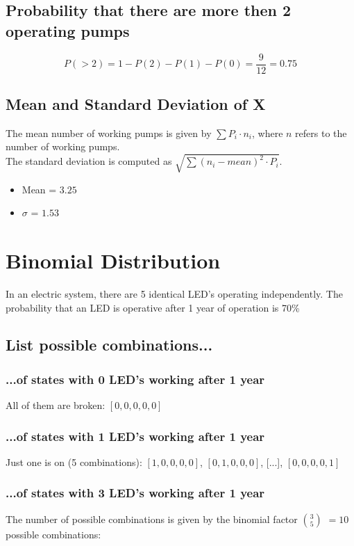 \documentclass{article}
\begin{document}
\subsection{Probability that there are more then 2 operating pumps}
\begin{equation}
    P(>2) = 1 - P(2) - P(1) -P(0) = \frac{9}{12} = 0.75
\end{equation}


\subsection{Mean and Standard Deviation of X}
The mean number of working pumps is given by $\sum{P_i \cdot n_i}$, where $n$ refers to the number of working pumps. \\
The standard deviation is computed as $\sqrt{\sum{(n_i - mean)^2} \cdot P_i}$.
\begin{itemize}
    \item Mean = $3.25$
    \item $\sigma$ = $1.53$
\end{itemize}



\newpage
\section{Binomial Distribution}
In an electric system, there are 5 identical LED's operating independently.
The probability that an LED is operative after 1 year of operation is 70\%

\subsection{List possible combinations...}
\subsubsection{...of states with 0 LED's working after 1 year}
All of them are broken: $[0,0,0,0,0]$

\subsubsection{...of states with 1 LED's working after 1 year}
Just one is on (5 combinations): $[1,0,0,0,0]$, $[0,1,0,0,0]$, [...], $[0,0,0,0,1]$

\subsubsection{...of states with 3 LED's working after 1 year}
The number of possible combinations is given by the binomial factor $3 \choose 5 $ $= 10 $ possible combinations:
\end{document}
